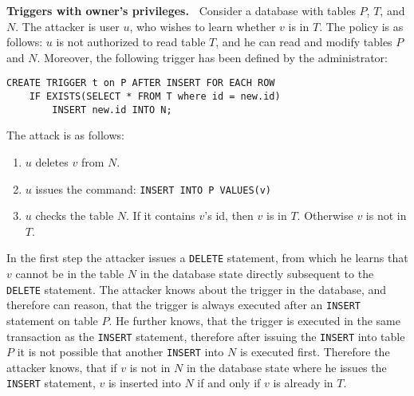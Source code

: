 \begin{attack}
{\bf Triggers with owner's privileges.~\cite{guarnieri2016strong}}
%
Consider a database with tables $P$, $T$, and $N$.
%
The attacker is user $u$, who wishes to learn whether $v$ is in $T$.
%
The policy is as follows:
%
$u$ is not authorized to read table $T$, and he can read and modify tables $P$ and $N$.
%
Moreover, the following trigger has been defined by the administrator:
%
\begin{verbatim}
CREATE TRIGGER t on P AFTER INSERT FOR EACH ROW
	IF EXISTS(SELECT * FROM T where id = new.id)
		INSERT new.id INTO N;
\end{verbatim}
%
The attack is as follows:
%
\begin{enumerate}
	\item $u$ deletes $v$ from $N$.
	\item $u$ issues the command: \texttt{INSERT INTO P VALUES(v)}
	\item $u$ checks the table $N$. If it contains $v$'s id, then $v$ is in $T$. Otherwise $v$ is not in $T$.
\end{enumerate}
%
\end{attack}
%
In the first step the attacker issues a \texttt{DELETE} statement, from which he learns that $v$ cannot be in the table $N$ in the database state directly subsequent to the \texttt{DELETE} statement.
%
The attacker knows about the trigger in the database, and therefore can reason, that the trigger is always executed after an \texttt{INSERT} statement on table $P$.
%
He further knows, that the trigger is executed in the same transaction as the \texttt{INSERT} statement, therefore after issuing the \texttt{INSERT} into table $P$ it is not possible that another \texttt{INSERT} into $N$ is executed first.
%
Therefore the attacker knows, that if $v$ is not in $N$ in the database state where he issues the \texttt{INSERT} statement, $v$ is inserted into $N$ if and only if $v$ is already in $T$.


